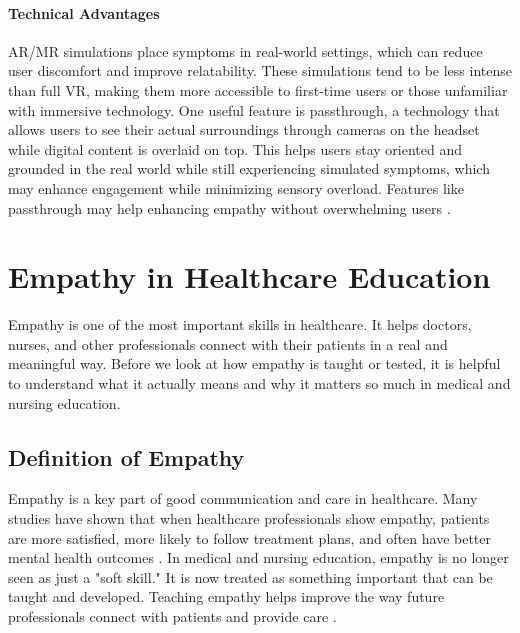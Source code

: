 \paragraph{Technical Advantages}

AR/MR simulations place symptoms in real-world settings, which can reduce user discomfort and improve relatability. These simulations tend to be less intense than full VR, making them more accessible to first-time users or those unfamiliar with immersive technology. One useful feature is passthrough, a technology that allows users to see their actual surroundings through cameras on the headset while digital content is overlaid on top. This helps users stay oriented and grounded in the real world while still experiencing simulated symptoms, which may enhance engagement while minimizing sensory overload. Features like passthrough may help enhancing empathy without overwhelming users \cite{Krogmeier2024, Silva2017, Lan2023}.

\section{Empathy in Healthcare Education}

Empathy is one of the most important skills in healthcare. It helps doctors, nurses, and other professionals connect with their patients in a real and meaningful way. Before we look at how empathy is taught or tested, it is helpful to understand what it actually means and why it matters so much in medical and nursing education.

\subsection{Definition of Empathy}
Empathy is a key part of good communication and care in healthcare. Many studies have shown that when healthcare professionals show empathy, patients are more satisfied, more likely to follow treatment plans, and often have better mental health outcomes \cite{Cunico2012, Olson1995, Ozcan2018}. In medical and nursing education, empathy is no longer seen as just a "soft skill." It is now treated as something important that can be taught and developed. Teaching empathy helps improve the way future professionals connect with patients and provide care \cite{Cunico2012}.

\vspace{1em}


